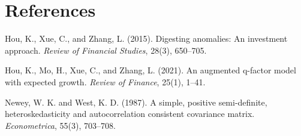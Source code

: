\documentclass[11pt]{article}
\begin{document}
\section*{References}
\begin{description}
\item Hou, K., Xue, C., and Zhang, L. (2015).
Digesting anomalies: An investment approach.
\textit{Review of Financial Studies}, 28(3), 650--705.
\item Hou, K., Mo, H., Xue, C., and Zhang, L. (2021).
An augmented q-factor model with expected growth.
\textit{Review of Finance}, 25(1), 1--41.
\item Newey, W. K. and West, K. D. (1987).
A simple, positive semi-definite, heteroskedasticity and autocorrelation consistent covariance matrix.
\textit{Econometrica}, 55(3), 703--708.
\end{description}
\end{document}
